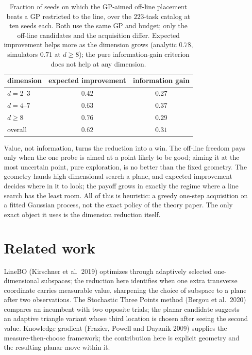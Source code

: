 \documentclass[11pt]{article}
\theoremstyle{itheads}
\begin{document}
\begin{table}[t]
\centering
\small
\begin{tabular}{lcc}
\toprule
dimension & expected improvement & information gain \\
\midrule
$d=2$--$3$ & $0.42$ & $0.27$ \\
$d=4$--$7$ & $0.63$ & $0.37$ \\
$d\ge 8$   & $0.76$ & $0.29$ \\
\midrule
overall    & $0.62$ & $0.31$ \\
\bottomrule
\end{tabular}
\caption{Fraction of seeds on which the GP-aimed off-line placement
beats a GP restricted to the line, over the $223$-task catalog at ten
seeds each. Both use the same GP and budget; only the off-line
candidates and the acquisition differ. Expected improvement helps more
as the dimension grows (analytic $0.78$, simulators $0.71$ at $d\ge8$);
the pure information-gain criterion does not help at any dimension.}
\label{tab:planargp}
\end{table}

Value, not information, turns the reduction into a win. The off-line
freedom pays only when the one probe is aimed at a point likely to be
good; aiming it at the most uncertain point, pure exploration, is
no better than the fixed geometry. The geometry hands high-dimensional
search a plane, and expected improvement decides where in it to look;
the payoff grows in exactly the regime where a line search has the
least room. All of this is heuristic: a greedy one-step acquisition
on a fitted Gaussian process, not the exact policy of the theory paper.
The only exact object it uses is the dimension reduction itself.

\section{Related work}

LineBO (Kirschner et al.\ 2019) optimizes through adaptively selected
one-dimensional subspaces; the reduction here identifies when one extra
transverse coordinate carries measurable value, sharpening the choice of
subspace to a plane after two observations. The Stochastic Three Points
method (Bergou et al.\ 2020) compares an incumbent with two opposite
trials; the planar candidate suggests an adaptive triangle variant whose
third location is chosen after seeing the second value. Knowledge
gradient (Frazier, Powell and Dayanik 2009) supplies the
measure-then-choose framework; the contribution here is explicit geometry
and the resulting planar move within it.
\end{document}

